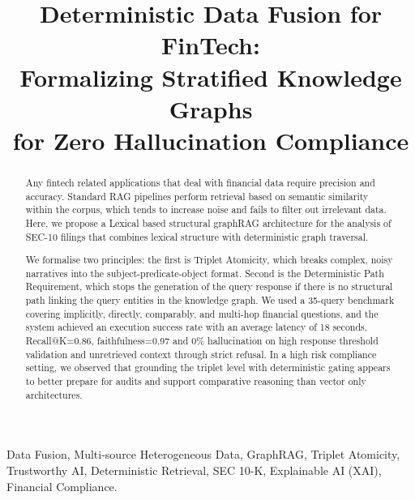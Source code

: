 \documentclass[conference]{IEEEtran}
\begin{document}
\title{Deterministic Data Fusion for FinTech:\\
Formalizing Stratified Knowledge Graphs\\
for Zero Hallucination Compliance}

\author{%
}

\maketitle

\begin{abstract}
Any fintech related applications that deal with financial data require precision and accuracy. Standard RAG pipelines perform retrieval based on semantic similarity within the corpus, which tends to increase noise and fails to filter out irrelevant data. Here, we propose a Lexical based structural graphRAG architecture for the analysis of SEC-10 filings that combines lexical structure with deterministic graph traversal.

We formalise two principles: the first is Triplet Atomicity, which breaks complex, noisy narratives into the subject-predicate-object format. Second is the Deterministic Path Requirement, which stops the generation of the query response if there is no structural path linking the query entities in the knowledge graph. We used a 35-query benchmark covering implicitly, directly, comparably, and multi-hop financial questions, and the system achieved an execution success rate with an average latency of 18 seconds, Recall@K=0.86, faithfulness=0.97 and 0\% hallucination on high response threshold validation and unretrieved context through strict refusal. In a high risk compliance setting, we observed that grounding the triplet level with deterministic gating appears to better prepare for audits and support comparative reasoning than vector only architectures.
\end{abstract}

\begin{IEEEkeywords}
Data Fusion, Multi-source Heterogeneous Data, GraphRAG, Triplet Atomicity, Trustworthy AI, Deterministic Retrieval, SEC 10-K, Explainable AI (XAI), Financial Compliance.
\end{IEEEkeywords}
\end{document}
